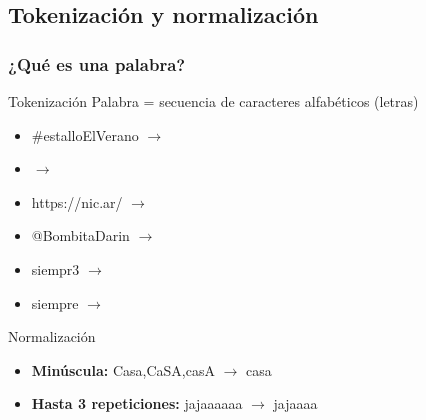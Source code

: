 
\subsection{Tokenización y normalización}

\begin{frame}[c]\frametitle{¿Qué es una palabra?}
    \begin{block}{Tokenización}
    Palabra = secuencia de caracteres alfabéticos (letras)
    \begin{multicols}{2}
    \begin{itemize}
        \item \#estalloElVerano $\rightarrow$ \xmark
        \item \smiley{} \frownie{} $\rightarrow$ \xmark
        \item https://nic.ar/ $\rightarrow$ \xmark
        \item @BombitaDarin $\rightarrow$ \xmark
        \item siempr3 $\rightarrow$ \xmark
        \item siempre $\rightarrow$ \cmark
    \end{itemize}

    \end{multicols}
    \end{block}

    \begin{block}{Normalización}
    \begin{itemize}
        \item \textbf{Minúscula:} Casa,CaSA,casA $\rightarrow$ casa
        \item \textbf{Hasta 3 repeticiones:} jajaaaaaa $\rightarrow$ jajaaaa
    \end{itemize}
    \end{block}

\end{frame}

